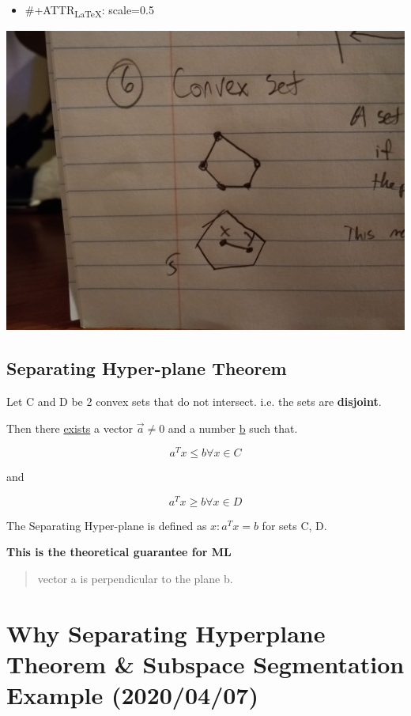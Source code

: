 \documentclass[11pt]{article}
\begin{document}
\begin{itemize}
\item \#+ATTR\textsubscript{\LaTeX{}}: scale=0.5
\end{itemize}
\begin{center}
\includegraphics[width=.9\linewidth]{./resources/convex1.jpg}
\end{center}

\subsection{Separating Hyper-plane Theorem}
\label{sec:org220404b}

Let C and D be 2 convex sets that do not intersect. i.e. the sets are
\textbf{disjoint}.

Then there \uline{exists} a vector \(\vec{a} \neq 0\) and a number \uline{b} such that.

$$
a^Tx \leq b \forall x \in C
$$

and

$$
a^T x \geq b \forall x \in D
$$

The Separating Hyper-plane is defined as \({x \colon a^T x = b}\) for sets C, D.

\textbf{This is the theoretical guarantee for ML}


\begin{quote}
vector a is perpendicular to the plane b.
\end{quote}
\section{Why Separating Hyperplane Theorem \& Subspace Segmentation Example (2020/04/07)}
\label{sec:org09c669a}
\end{document}
